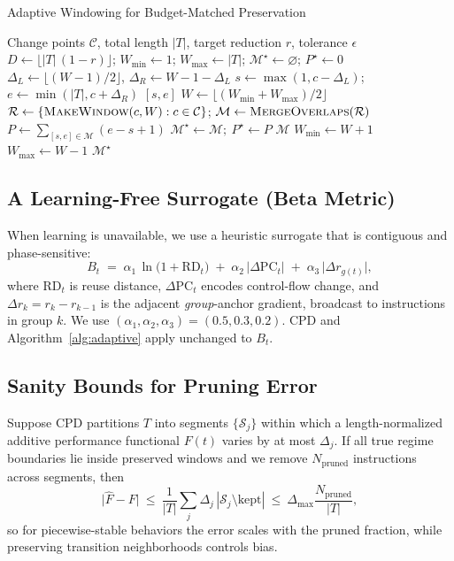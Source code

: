 \documentclass[conference]{IEEEtran}
\begin{document}
\begin{algorithm}[t]
\caption{Adaptive Windowing for Budget-Matched Preservation}
\label{alg:adaptive}
\small
\begin{algorithmic}[1]
\Require Change points \(\mathcal{C}\), total length \(|T|\), target reduction \(r\), tolerance \(\epsilon\)
\State \(D\gets \lfloor |T|\,(1-r)\rfloor\); \(W_{\min}\gets 1\); \(W_{\max}\gets |T|\); \(\mathcal{M}^\star\gets\varnothing\); \(P^\star\gets 0\)
  \State \(\Delta_L\gets\lfloor(W-1)/2\rfloor\), \(\Delta_R\gets W-1-\Delta_L\)
  \State \(s\gets\max(1,c-\Delta_L)\); \(e\gets\min(|T|,c+\Delta_R)\)
  \State \Return \([s,e]\)
\EndFunction
{}
  \State \(W\gets\lfloor(W_{\min}+W_{\max})/2\rfloor\)
  \State \(\mathcal{R}\gets \{\textsc{MakeWindow}(c,W):c\in\mathcal{C}\}\); \(\mathcal{M}\gets \textsc{MergeOverlaps}(\mathcal{R})\)
  \State \(P\gets\sum_{[s,e]\in\mathcal{M}}(e-s+1)\)
   \(\mathcal{M}^\star\gets\mathcal{M};\ P^\star\gets P\) \EndIf
   \Return \(\mathcal{M}\) \EndIf
   \State \(W_{\min}\gets W+1\) \Else \State \(W_{\max}\gets W-1\) \EndIf
\EndWhile
\State \Return \(\mathcal{M}^\star\) 
\end{algorithmic}
\end{algorithm}

\subsection{A Learning-Free Surrogate (Beta Metric)}
\label{subsec:beta}
When learning is unavailable, we use a heuristic surrogate that is contiguous and phase-sensitive:
\begin{equation}
\label{eq:beta}
B_t \;=\; \alpha_1\,\ln\big(1+\mathrm{RD}_t\big)\;+\;\alpha_2\,\big|\Delta\mathrm{PC}_t\big|\;+\;\alpha_3\,\big|\Delta r_{g(t)}\big|,
\end{equation}
where \(\mathrm{RD}_t\) is reuse distance, \(\Delta\mathrm{PC}_t\) encodes control-flow change, and \(\Delta r_k=r_k-r_{k-1}\) is the adjacent \emph{group}-anchor gradient, broadcast to instructions in group \(k\). We use \((\alpha_1,\alpha_2,\alpha_3)=(0.5,0.3,0.2)\). CPD and Algorithm~\ref{alg:adaptive} apply unchanged to \(B_t\).

\subsection{Sanity Bounds for Pruning Error}
Suppose CPD partitions \(T\) into segments \(\{\mathcal{S}_j\}\) within which a length-normalized additive performance functional \(F(t)\) varies by at most \(\Delta_j\). If all true regime boundaries lie inside preserved windows and we remove \(N_{\mathrm{pruned}}\) instructions across segments, then
\[
\big|\widehat{F}-F\big|\ \le\ \frac{1}{|T|}\sum_j \Delta_j\, |\mathcal{S}_j\setminus\text{kept}|\ \le\ \Delta_{\max}\frac{N_{\mathrm{pruned}}}{|T|},
\]
so for piecewise-stable behaviors the error scales with the pruned fraction, while preserving transition neighborhoods controls bias.
\end{document}
